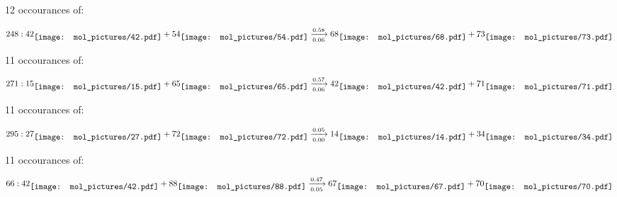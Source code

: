 \documentclass{article}
\begin{document}
\vspace{1cm}


12 occourances of:

$$
248:  
42
\raisebox{-.5\height}{\texttt{[image: mol\_pictures/42.pdf]}}
+
54
\raisebox{-.5\height}{\texttt{[image: mol\_pictures/54.pdf]}}
\xrightarrow[0.06]{0.58}
68
\raisebox{-.5\height}{\texttt{[image: mol\_pictures/68.pdf]}}
+
73
\raisebox{-.5\height}{\texttt{[image: mol\_pictures/73.pdf]}}
$$



\vspace{1cm}


11 occourances of:

$$
271:  
15
\raisebox{-.5\height}{\texttt{[image: mol\_pictures/15.pdf]}}
+
65
\raisebox{-.5\height}{\texttt{[image: mol\_pictures/65.pdf]}}
\xrightarrow[0.06]{0.57}
42
\raisebox{-.5\height}{\texttt{[image: mol\_pictures/42.pdf]}}
+
71
\raisebox{-.5\height}{\texttt{[image: mol\_pictures/71.pdf]}}
$$



\vspace{1cm}


11 occourances of:

$$
295:  
27
\raisebox{-.5\height}{\texttt{[image: mol\_pictures/27.pdf]}}
+
72
\raisebox{-.5\height}{\texttt{[image: mol\_pictures/72.pdf]}}
\xrightarrow[0.00]{0.05}
14
\raisebox{-.5\height}{\texttt{[image: mol\_pictures/14.pdf]}}
+
34
\raisebox{-.5\height}{\texttt{[image: mol\_pictures/34.pdf]}}
$$



\vspace{1cm}


11 occourances of:

$$
66:  
42
\raisebox{-.5\height}{\texttt{[image: mol\_pictures/42.pdf]}}
+
88
\raisebox{-.5\height}{\texttt{[image: mol\_pictures/88.pdf]}}
\xrightarrow[0.05]{0.47}
67
\raisebox{-.5\height}{\texttt{[image: mol\_pictures/67.pdf]}}
+
70
\raisebox{-.5\height}{\texttt{[image: mol\_pictures/70.pdf]}}
$$



\vspace{1cm}
\end{document}
